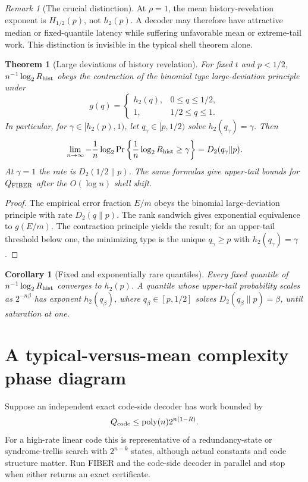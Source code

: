 \documentclass[11pt]{article}
\newtheorem{theorem}{Theorem}
\newtheorem{corollary}{Corollary}
\theoremstyle{definition}
\theoremstyle{remark}
\newtheorem{remark}{Remark}
\newcommand{\Qfib}{Q_{\rm FIBER}}
\newcommand{\Qcode}{Q_{\rm code}}
\newcommand{\Rhist}{R_{\rm hist}}
\newcommand{\Dkl}{D_2}
\newcommand{\hbin}{h_2}
\newcommand{\Renyi}{H}
\newcommand{\poly}{\operatorname{poly}}
\begin{document}
\begin{remark}[The crucial distinction]
At $\rho=1$, the mean history-revelation exponent is $\Renyi_{1/2}(p)$, not $\hbin(p)$.  A decoder may therefore have attractive median or fixed-quantile latency while suffering unfavorable mean or extreme-tail work.  This distinction is invisible in the typical shell theorem alone.
\end{remark}

\begin{theorem}[Large deviations of history revelation]
\label{thm:ldp}
For fixed $t$ and $p<1/2$, $n^{-1}\log_2\Rhist$ obeys the contraction of the binomial type large-deviation principle under
\[
g(q)=\begin{cases}
\hbin(q),&0\le q\le1/2,\\
1,&1/2\le q\le1.
\end{cases}
\]
In particular, for $\gamma\in[\hbin(p),1)$, let $q_\gamma\in[p,1/2)$ solve $\hbin(q_\gamma)=\gamma$.  Then
\begin{equation}
\lim_{n\to\infty}-\frac1n\log_2\Pr\left\{\frac1n\log_2\Rhist\ge\gamma\right\}
=\Dkl(q_\gamma\|p).
\label{eq:tail}
\end{equation}
At $\gamma=1$ the rate is $\Dkl(1/2\|p)$.  The same formulas give upper-tail bounds for $\Qfib$ after the $O(\log n)$ shell shift.
\end{theorem}
\begin{proof}
The empirical error fraction $E/m$ obeys the binomial large-deviation principle with rate $\Dkl(q\|p)$.  The rank sandwich gives exponential equivalence to $g(E/m)$.  The contraction principle yields the result; for an upper-tail threshold below one, the minimizing type is the unique $q_\gamma\ge p$ with $\hbin(q_\gamma)=\gamma$.
\end{proof}

\begin{corollary}[Fixed and exponentially rare quantiles]
Every fixed quantile of $n^{-1}\log_2\Rhist$ converges to $\hbin(p)$.  A quantile whose upper-tail probability scales as $2^{-n\beta}$ has exponent $\hbin(q_\beta)$, where $q_\beta\in[p,1/2]$ solves $\Dkl(q_\beta\|p)=\beta$, until saturation at one.
\end{corollary}

\section{A typical-versus-mean complexity phase diagram}
Suppose an independent exact code-side decoder has work bounded by
\[
\Qcode\le\poly(n)2^{n(1-R)}.
\]
For a high-rate linear code this is representative of a redundancy-state or syndrome-trellis search with $2^{n-k}$ states, although actual constants and code structure matter.  Run FIBER and the code-side decoder in parallel and stop when either returns an exact certificate.
\end{document}
